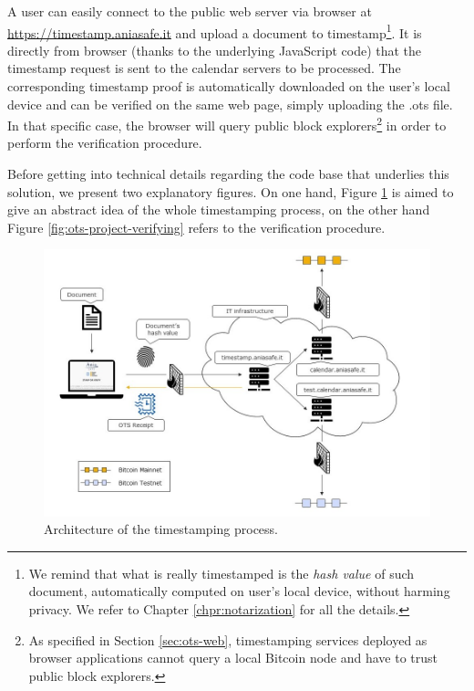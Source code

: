 \bigskip
\noindent
A user can easily connect to the public web server via browser at \url{https://timestamp.aniasafe.it} and upload a document to timestamp\footnote{We remind that what is really timestamped is the \textit{hash value} of such document, automatically computed on user's local device, without harming privacy. We refer to Chapter \ref{chpr:notarization} for all the details.}. It is directly from browser (thanks to the underlying JavaScript code) that the timestamp request is sent to the calendar servers to be processed. The corresponding timestamp proof is automatically downloaded on the user's local device and can be verified on the same web page, simply uploading the \colorbox{light-gray}{.ots} file. In that specific case, the browser will query public block explorers\footnote{As specified in Section \ref{sec:ots-web}, timestamping services deployed as browser applications cannot query a local Bitcoin node and have to trust public block explorers.} in order to perform the verification procedure. 

\bigskip
\noindent
Before getting into technical details regarding the code base that underlies this solution, we present two explanatory figures. On one hand, Figure \ref{fig:ots-project-stamping} is aimed to give an abstract idea of the whole timestamping process, on the other hand Figure \ref{fig:ots-project-verifying} refers to the verification procedure.

\begin{figure}[!htb]
    \centering
	\includegraphics[width=1\linewidth]{Images/project-stamping.jpg}
	\caption{Architecture of the timestamping process.}
	\label{fig:ots-project-stamping}
\end{figure}

